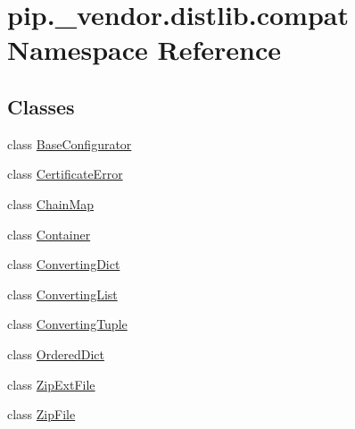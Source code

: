 \hypertarget{namespacepip_1_1__vendor_1_1distlib_1_1compat}{}\section{pip.\+\_\+vendor.\+distlib.\+compat Namespace Reference}
\label{namespacepip_1_1__vendor_1_1distlib_1_1compat}
\subsection*{Classes}
\begin{DoxyCompactItemize}
\item 
class \hyperlink{classpip_1_1__vendor_1_1distlib_1_1compat_1_1BaseConfigurator}{Base\+Configurator}
\item 
class \hyperlink{classpip_1_1__vendor_1_1distlib_1_1compat_1_1CertificateError}{Certificate\+Error}
\item 
class \hyperlink{classpip_1_1__vendor_1_1distlib_1_1compat_1_1ChainMap}{Chain\+Map}
\item 
class \hyperlink{classpip_1_1__vendor_1_1distlib_1_1compat_1_1Container}{Container}
\item 
class \hyperlink{classpip_1_1__vendor_1_1distlib_1_1compat_1_1ConvertingDict}{Converting\+Dict}
\item 
class \hyperlink{classpip_1_1__vendor_1_1distlib_1_1compat_1_1ConvertingList}{Converting\+List}
\item 
class \hyperlink{classpip_1_1__vendor_1_1distlib_1_1compat_1_1ConvertingTuple}{Converting\+Tuple}
\item 
class \hyperlink{classpip_1_1__vendor_1_1distlib_1_1compat_1_1OrderedDict}{Ordered\+Dict}
\item 
class \hyperlink{classpip_1_1__vendor_1_1distlib_1_1compat_1_1ZipExtFile}{Zip\+Ext\+File}
\item 
class \hyperlink{classpip_1_1__vendor_1_1distlib_1_1compat_1_1ZipFile}{Zip\+File}
\end{DoxyCompactItemize}

